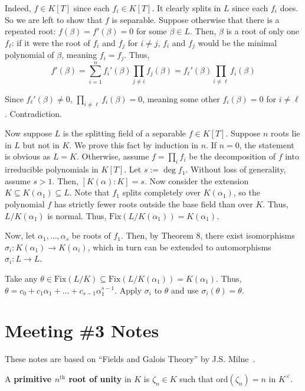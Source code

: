 \documentclass{template}
\begin{document}
Indeed, $f \in K[T]$ since each $f_i \in K[T]$. It clearly splits in $L$ since
each $f_i$ does. So we are left to show that $f$ is separable. Suppose otherwise
that there is a repeated root: $f(\beta)=f'(\beta)=0$ for some $\beta \in L$.
Then, $\beta$ is a root of only one $f_{\ell}$: if it were the root of $f_i$ and
$f_j$ for $i \neq j$, $f_i$ and $f_j$ would be the minimal polynomial of
$\beta$, meaning $f_i=f_j$. Thus,
\begin{equation*}
    f'(\beta) = \sum_{i=1}^n f_i'(\beta) \prod_{j \neq i} f_j(\beta) = f_{\ell}'(\beta) \prod_{i \neq \ell}f_i(\beta)
\end{equation*}

Since $f_{\ell}'(\beta) \neq 0$, $\prod_{i \neq \ell}f_i(\beta)=0$, meaning some
other $f_i(\beta)=0$ for $i \neq \ell$. Contradiction.

Now suppose $L$ is the splitting field of a separable $f \in K[T]$. Suppose $n$
roots lie in $L$ but not in $K$. We prove this fact by induction in $n$. If
$n=0$, the statement is obvious as $L=K$. Otherwise, assume $f = \prod_i f_i$ be
the decomposition of $f$ into irreducible polynomials in $K[T]$. Let $s:=\deg
f_1$. Without loss of generality, assume $s>1$. Then, $[K(\alpha):K]=s$. Now
consider the extension $K \subseteq K(\alpha_1) \subseteq L$. Note that $f_1$
splits completely over $K(\alpha_1)$, so the polynomial $f$ has strictly fewer
roots outside the base field than over $K$. Thus, $L/K(\alpha_1)$ is normal.
Thus, $\text{Fix}(L/K(\alpha_1)) = K(\alpha_1)$.

Now, let $\alpha_1,\dots,\alpha_s$ be roots of $f_1$. Then, by Theorem 8, there
exist isomorphisms $\sigma_i: K(\alpha_1) \to K(\alpha_i)$, which in turn can be
extended to automorphisms $\sigma_i: L \to L$.

Take any $\theta \in \text{Fix}(L/K) \subseteq
\text{Fix}(L/K(\alpha_1))=K(\alpha_1)$. Thus,
$\theta=c_0+c_1\alpha_1+\dots+c_{s-1}\alpha_1^{s-1}$. Apply $\sigma_i$ to
$\theta$ and use $\sigma_i(\theta)=\theta$.

\section{Meeting \#3 Notes}

These notes are based on ``Fields and Galois Theory'' by J.S. Milne~\cite{milneFT}. 

\begin{definition}
    A \textbf{primitive $n^{\text{th}}$ root of unity} in $K$ is $\zeta_n \in K$
    such that $\text{ord}(\zeta_n)=n$ in $K^{\times}$.
\end{definition}
\end{document}
